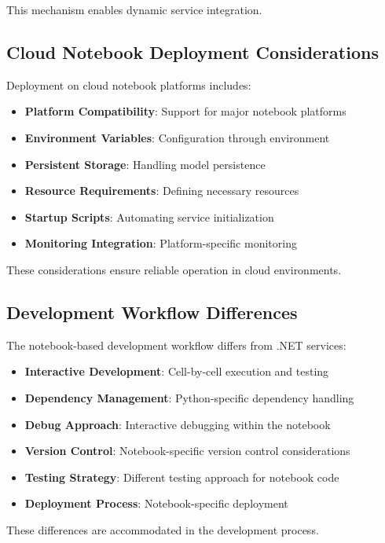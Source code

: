This mechanism enables dynamic service integration.

\subsection{Cloud Notebook Deployment Considerations}
Deployment on cloud notebook platforms includes:
\begin{itemize}
    \item \textbf{Platform Compatibility}: Support for major notebook platforms
    \item \textbf{Environment Variables}: Configuration through environment
    \item \textbf{Persistent Storage}: Handling model persistence
    \item \textbf{Resource Requirements}: Defining necessary resources
    \item \textbf{Startup Scripts}: Automating service initialization
    \item \textbf{Monitoring Integration}: Platform-specific monitoring
\end{itemize}

These considerations ensure reliable operation in cloud environments.

\subsection{Development Workflow Differences}
The notebook-based development workflow differs from .NET services:
\begin{itemize}
    \item \textbf{Interactive Development}: Cell-by-cell execution and testing
    \item \textbf{Dependency Management}: Python-specific dependency handling
    \item \textbf{Debug Approach}: Interactive debugging within the notebook
    \item \textbf{Version Control}: Notebook-specific version control considerations
    \item \textbf{Testing Strategy}: Different testing approach for notebook code
    \item \textbf{Deployment Process}: Notebook-specific deployment
\end{itemize}

These differences are accommodated in the development process.


